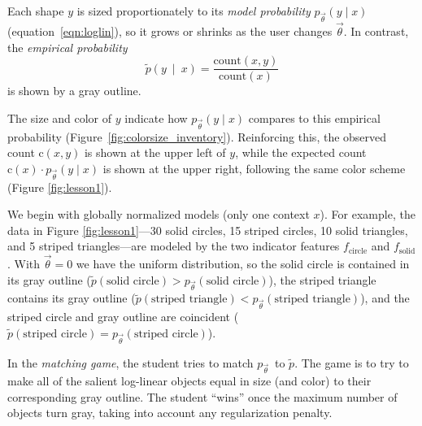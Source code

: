 \documentclass[11pt,letterpaper]{article}
\newcommand{\empirical}[0]{\ensuremath{\tilde{p}}}
\begin{document}
Each shape $y$ is sized proportionately to its {\em model
probability} $p_{\vec{\theta}}(y \mid x)$ (equation~\eqref{eqn:loglin}), so it grows or shrinks as the user changes
$\vec{\theta}$.  
In contrast, the {\em empirical probability} 
\begin{equation}
\empirical\left(y\ \mid\ x\right) = \frac{\text{count}(x,y)}{\text{count}(x)} 
\label{eqn:empirical_distr}
\end{equation} 
is shown by a gray outline.

The size and color of $y$  indicate how $p_{\vec{\theta}}(y\mid x)$ compares to 
this empirical probability (Figure~\ref{fig:colorsize_inventory}).  
Reinforcing this, the observed count $\text{c}(x,y)$ is shown at the upper
left of $y$, while the expected count $\text{c}(x)\cdot
p_{\vec{\theta}}(y\mid x)$ is shown at the upper right, following the same color 
scheme (Figure \ref{fig:lesson1}). 

We begin with globally normalized models (only one 
context $x$).  For example, the data in Figure \ref{fig:lesson1}---30 solid
circles, 15 striped circles, 10 solid triangles, and 5 striped
triangles---are modeled by the two indicator features
$f_{\textrm{circle}}$ and $f_{\textrm{solid}}$. With $\vec{\theta} =
0$ we have the uniform distribution, so the solid circle is contained
in its gray outline ($\empirical{}(\textrm{solid circle}) >
p_{\vec{\theta}}(\textrm{solid circle})$), the striped triangle
contains its gray outline ($\empirical{}(\textrm{striped triangle}) <
p_{\vec{\theta}}(\textrm{striped triangle})$), and the striped
circle and gray outline are coincident ($\empirical{}(\textrm{striped
  circle}) = p_{\vec{\theta}}(\textrm{striped circle})$).%

In the \textit{matching game}, the student tries to match $p_{\vec{\theta}}$\ to  $\tilde{p}$. 
The game is to try to make all of the salient log-linear objects 
equal in size (and color) to their corresponding gray outline. 
The student ``wins'' once the maximum number of objects turn gray, 
taking into account any regularization penalty.
\end{document}

